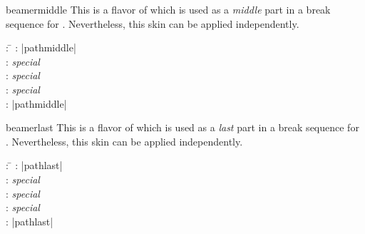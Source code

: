\begin{docSkin}{beamermiddle}
This is a flavor of  which is used as a \emph{middle} part
in a break sequence for .
Nevertheless, this skin can be applied independently.
\begin{tcolorbox}[skintable=beamermiddle]
  \begin{tabbing}
    : \=\kill
    :           \> |pathmiddle|\\
    : \> \emph{special}\\ 
    :        \> \emph{special}\\
    :    \> \emph{special}\\
    :           \> |pathmiddle|
  \end{tabbing}
\end{tcolorbox}
\end{docSkin}


\begin{dispExample}
\end{dispExample}


\clearpage
\begin{docSkin}{beamerlast}
This is a flavor of  which is used as a \emph{last} part
in a break sequence for .
Nevertheless, this skin can be applied independently.
\begin{tcolorbox}[skintable=beamerlast]
  \begin{tabbing}
    : \=\kill
    :           \> |pathlast|\\
    : \> \emph{special}\\ 
    :        \> \emph{special}\\
    :    \> \emph{special}\\
    :           \> |pathlast|
  \end{tabbing}
\end{tcolorbox}
\end{docSkin}

\begin{dispExample}
\end{dispExample}



